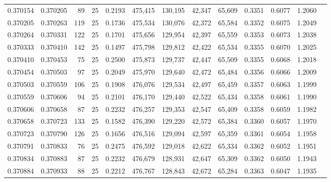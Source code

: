 \begin{tabular}{rrrrrrrrrrrrr}
0.370154 & 0.370205 &    89 &  25 &                                     0.2193 & 475,415 & 130,195 &  42,347 &  65,609 & 0.3351 & 0.6077 & 1.2060 \\
0.370205 & 0.370263 &   119 &  25 &                                     0.1736 & 475,534 & 130,076 &  42,372 &  65,584 & 0.3352 & 0.6075 & 1.2049 \\
0.370264 & 0.370331 &   122 &  25 &                                     0.1701 & 475,656 & 129,954 &  42,397 &  65,559 & 0.3353 & 0.6073 & 1.2038 \\
0.370333 & 0.370410 &   142 &  25 &                                     0.1497 & 475,798 & 129,812 &  42,422 &  65,534 & 0.3355 & 0.6070 & 1.2025 \\
0.370410 & 0.370453 &    75 &  25 &                                     0.2500 & 475,873 & 129,737 &  42,447 &  65,509 & 0.3355 & 0.6068 & 1.2018 \\
0.370454 & 0.370503 &    97 &  25 &                                     0.2049 & 475,970 & 129,640 &  42,472 &  65,484 & 0.3356 & 0.6066 & 1.2009 \\
0.370503 & 0.370559 &   106 &  25 &                                     0.1908 & 476,076 & 129,534 &  42,497 &  65,459 & 0.3357 & 0.6063 & 1.1999 \\
0.370559 & 0.370606 &    94 &  25 &                                     0.2101 & 476,170 & 129,440 &  42,522 &  65,434 & 0.3358 & 0.6061 & 1.1990 \\
0.370606 & 0.370658 &    87 &  25 &                                     0.2232 & 476,257 & 129,353 &  42,547 &  65,409 & 0.3358 & 0.6059 & 1.1982 \\
0.370658 & 0.370723 &   133 &  25 &                                     0.1582 & 476,390 & 129,220 &  42,572 &  65,384 & 0.3360 & 0.6057 & 1.1970 \\
0.370723 & 0.370790 &   126 &  25 &                                     0.1656 & 476,516 & 129,094 &  42,597 &  65,359 & 0.3361 & 0.6054 & 1.1958 \\
0.370791 & 0.370833 &    76 &  25 &                                     0.2475 & 476,592 & 129,018 &  42,622 &  65,334 & 0.3362 & 0.6052 & 1.1951 \\
0.370834 & 0.370883 &    87 &  25 &                                     0.2232 & 476,679 & 128,931 &  42,647 &  65,309 & 0.3362 & 0.6050 & 1.1943 \\
0.370884 & 0.370933 &    88 &  25 &                                     0.2212 & 476,767 & 128,843 &  42,672 &  65,284 & 0.3363 & 0.6047 & 1.1935 \\

\end{tabular}
